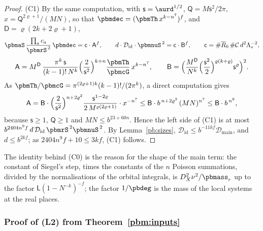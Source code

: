 \documentclass[10pt]{amsart}
\theoremstyle{definition}
\theoremstyle{remark}
\providecommand{\auDX}{D_X}
\providecommand{\pbDid}{\mathcal D_{\mathrm{id}}}
\providecommand{\pbDmain}{\mathcal D_{\mathrm{main}}}
\providecommand{\pbR}{\overline R_0}
\begin{document}
\begin{proof}
(C1) By the same computation, with $\mathsf s=\aurd^{1/2}$, $\mathsf Q=M\mathsf s^2/2\pi$, $x=
\mathsf Q^{2\varrho+1}/(MN)$, so that $\pbmdec=(\pbmTh\,x^{k-n^7})^f$, and $\mathsf D=\varrho(2k+2
\varrho+1)$,
\[
\pbmaS\,\frac{\prod_ac_a}{\pbmrS^{\,2}}\,\pbmdec=\mathsf c\cdot\mathsf A^f,\qquad d\cdot\pbDid\cdot\pbmnuS^{
\,2}=\mathsf c\cdot\mathsf B^f,\qquad\mathsf c=\#\pbR\,\#\mathcal C\,d^2\Lambda_*^{-2},
\]
\[
\mathsf A=M^{\mathsf D}\,\frac{\pi^k\,\mathsf s}{(k-1)!\,N^k}\Bigl(\frac2{\mathsf s^2}\Bigr)^{k+n}\frac{
\pbmTh}{\pbmcG}\,x^{k-n^7},\qquad\mathsf B=\Bigl(\frac{M^{\mathsf D}}{N^k}\Bigl(\frac{\mathsf s^2}2
\Bigr)^{\varrho(k+\varrho)}\mathsf s^{\varrho}\Bigr)^2 .
\]
As $\pbmTh/\pbmcG=\pi^{(2\varrho+1)k}(k-1)!/(2\pi^k)$, a direct computation gives
\[
\mathsf A=\mathsf B\cdot\Bigl(\frac2{\mathsf s^2}\Bigr)^{n+2\varrho^2}\frac{\mathsf s^{1-2\varrho}}{2\,M^{
\varrho(2\varrho+1)}}\cdot x^{-n^7}\le\mathsf B\cdot b^{\,n+2\varrho^2}\,(MN)^{n^7}\le\mathsf B\cdot b^{\,n^9},
\]
because $\mathsf s\ge1$, $\mathsf Q\ge1$ and $MN\le b^{23+60n}$. Hence the left side of (C1) is at
most $b^{2404n^9f}\,d\,\pbDid\,\pbmrS^{\,2}\pbmnuS^{\,2}$. By Lemma~\ref{pb:sizes}, $\pbDid\le b^{-11kf}
\pbDmain$, and $d\le b^{2kf}$; as $2404n^9f+10\le3kf$, (C1) follows.
\end{proof}

The identity behind \textup{(C0)} is the reason for the shape of the main term: the constant of
Siegel's step, times the constants of the $n$ Poisson summations, divided by the normalisations of
the orbital integrals, is $\auDX^2\nu^2/\pbmass_r$ up to the factor $\mathsf L(1-N^{-k})^{-f}$; the
factor $1/\pbdeg$ is the mass of the local systems at the real places.

\subsubsection{Proof of \textup{(L2)} from Theorem~\ref{pbm:inputs}}\label{pbm:ss-L2}
\end{document}
